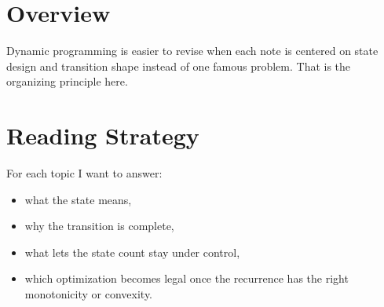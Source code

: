 \section*{Overview}

Dynamic programming is easier to revise when each note is centered on state design and transition shape instead of
one famous problem. That is the organizing principle here.

\section*{Reading Strategy}

For each topic I want to answer:

\begin{itemize}
  \item what the state means,
  \item why the transition is complete,
  \item what lets the state count stay under control,
  \item which optimization becomes legal once the recurrence has the right monotonicity or convexity.
\end{itemize}
